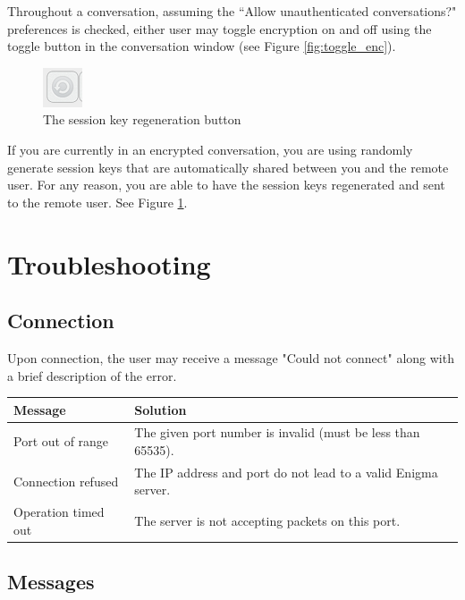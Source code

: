   Throughout a conversation, assuming the ``Allow unauthenticated conversations?" preferences is checked, either user may toggle encryption on and off using the toggle button in the conversation window (see Figure \ref{fig:toggle_enc}).
  
  \begin{figure}
    \centering
    \includegraphics[scale=0.6]{./Figures/AppD/D-5-2b.png}
    \caption{The session key regeneration button}
    \label{fig:regen_keys}
  \end{figure}
  
  If you are currently in an encrypted conversation, you are using randomly generate session keys that are automatically shared between you and the remote user. For any reason, you are able to have the session keys regenerated and sent to the remote user. See Figure \ref{fig:regen_keys}.
  
\section{Troubleshooting}

\subsection{Connection}

Upon connection, the user may receive a message "Could not connect" along with a brief description of the error.

\begin{center}
  \begin{tabular}{|l|p{5.0cm}|}
    \hline
    \textbf{Message} & \textbf{Solution} \\ \hline \hline
    Port out of range & The given port number is invalid (must be less than 65535). \\ \hline
    Connection refused & The IP address and port do not lead to a valid Enigma server. \\ \hline
    Operation timed out & The server is not accepting packets on this port. \\
    \hline
  \end{tabular}
\end{center}

\subsection{Messages}

